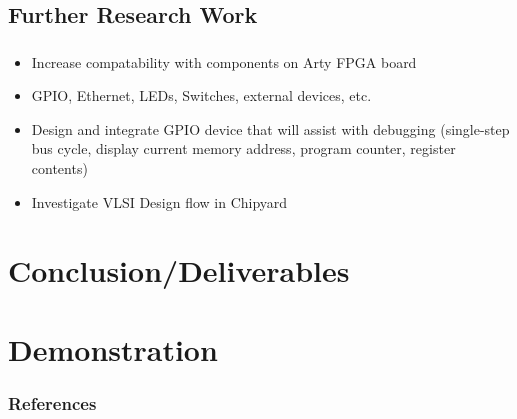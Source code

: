 \documentclass{eceday}
\begin{document}
\subsection{Further Research Work}\label{subsec:Further_Research_Work}
\begin{frame}
  \frametitle{}
  \begin{itemize}
  	\item Increase compatability with components on Arty FPGA board
  	\item GPIO, Ethernet, LEDs, Switches, external devices, etc.
  	\item Design and integrate GPIO device that will assist with debugging (single-step bus cycle, display current memory address, program counter, register contents)
  	\item Investigate VLSI Design flow in Chipyard
  	
  \end{itemize}
\end{frame}

\section{Conclusion/Deliverables}\label{sec:Conclusion_Deliverables}
\begin{frame}
  \frametitle{}
\end{frame}

\section{Demonstration}\label{sec:Demonstration}
\begin{frame}
  \frametitle{}
\end{frame}

\begin{frame}
  \frametitle{References}

  \printbibliography[heading=bibintoc]{}
\end{frame}
\end{document}
